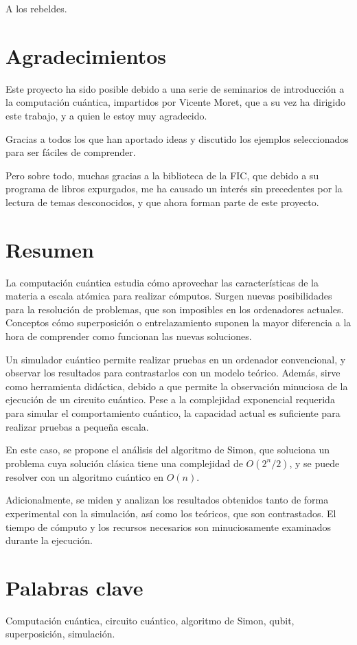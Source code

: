 \begin{dedication}
A los rebeldes.
\end{dedication}

\thispagestyle{empty}
\cleardoublepage
\chapter*{Agradecimientos}

Este proyecto ha sido posible debido a una serie de seminarios de introducción a 
la computación cuántica, impartidos por Vicente Moret, que a su vez ha dirigido 
este trabajo, y a quien le estoy muy agradecido.

Gracias a todos los que han aportado ideas y discutido los ejemplos 
seleccionados para ser fáciles de comprender.

Pero sobre todo, muchas gracias a la biblioteca de la FIC, que debido a su 
programa de libros expurgados, me ha causado un interés sin precedentes por la 
lectura de temas desconocidos, y que ahora forman parte de este proyecto.

\clearpage
\thispagestyle{empty}
\cleardoublepage

\chapter*{Resumen}
\noindent
La computación cuántica estudia cómo aprovechar las características de la 
materia a escala atómica para realizar cómputos. Surgen nuevas posibilidades 
para la resolución de problemas, que son imposibles en los ordenadores actuales.  
Conceptos cómo superposición o entrelazamiento suponen la mayor diferencia a la 
hora de comprender como funcionan las nuevas soluciones.

Un simulador cuántico permite realizar pruebas en un ordenador convencional, y 
observar los resultados para contrastarlos con un modelo teórico. Además, sirve 
como herramienta didáctica, debido a que permite la observación minuciosa de la 
ejecución de un circuito cuántico. Pese a la complejidad exponencial requerida 
para simular el comportamiento cuántico, la capacidad actual es suficiente para 
realizar pruebas a pequeña escala.

En este caso, se propone el análisis del algoritmo de Simon, que soluciona un 
problema cuya solución clásica tiene una complejidad de $O(2^n/2)$, y se puede 
resolver con un algoritmo cuántico en $O(n)$.

Adicionalmente, se miden y analizan los resultados obtenidos tanto de forma 
experimental con la simulación, así como los teóricos, que son contrastados. El 
tiempo de cómputo y los recursos necesarios son minuciosamente examinados 
durante la ejecución.


{\let\clearpage\relax \chapter*{Palabras clave}}
\noindent
Computación cuántica, circuito cuántico, algoritmo de Simon, qubit,
superposición, simulación.
